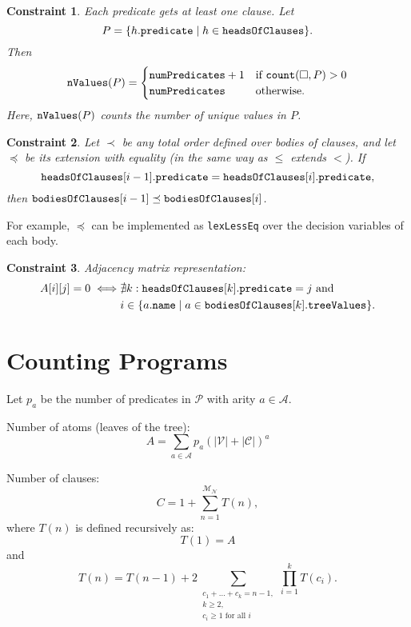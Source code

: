 \documentclass[runningheads]{llncs}
\newtheorem{constraint}{Constraint}
\newcommand{\variable}[1]{\texttt{\textup{#1}}}
\newcommand{\predicates}{\mathcal{P}}
\newcommand{\variables}{\mathcal{V}}
\newcommand{\constants}{\mathcal{C}}
\newcommand{\arities}{\mathcal{A}}
\newcommand{\maxNumNodes}{\mathcal{M}_{\mathcal{N}}}
\begin{document}
\begin{constraint}
  Each predicate gets at least one clause. Let
  \[
    P = \{ h.\variable{predicate} \mid h \in \variable{headsOfClauses} \}.
  \]
  Then
  \[
    \variable{nValues}(P) =
    \begin{cases}
      \variable{numPredicates} + 1 & \text{if } \variable{count}(\Box, P) > 0 \\
      \variable{numPredicates} & \text{otherwise.}
    \end{cases}
  \]
  Here, $\variable{nValues}(P)$ counts the number of unique values in $P$.
\end{constraint}

\begin{constraint}
  Let $\prec$ be any total order defined over bodies of clauses, and let
  $\preceq$ be its extension with equality (in the same way as $\le$ extends
  $<$). If
  \[
    \variable{headsOfClauses}[i-1].\variable{predicate} =
    \variable{headsOfClauses}[i].\variable{predicate},
  \]
  then $\variable{bodiesOfClauses}[i-1] \preceq \variable{bodiesOfClauses}[i]$.
\end{constraint}
For example, $\preceq$ can be implemented as \variable{lexLessEq} over the
decision variables of each body. %

\begin{constraint}
  Adjacency matrix representation:
  \begin{align*}
    A[i][j] = 0 \iff &\nexists k: \variable{headsOfClauses}[k].\variable{predicate} = j \text{ and } \\
    &i \in \{ a.\variable{name} \mid a \in \variable{bodiesOfClauses}[k].\variable{treeValues} \}.
  \end{align*}
\end{constraint}

\section{Counting Programs}

Let $p_a$ be the number of predicates in $\predicates{}$ with arity $a \in
\arities{}$.

Number of atoms (leaves of the tree):
\[
  A = \sum_{a \in \arities{}} p_a(|\variables{}| + |\constants{}|)^a
\]

Number of clauses:
\[
  C = 1 + \sum_{n=1}^{\maxNumNodes{}} T(n),
\]
where $T(n)$ is defined recursively as:
\[
  T(1) = A
\]
and
\[
  T(n) = T(n-1) + 2\sum_{\substack{c_1 + \dots + c_k = n - 1,\\
      k \ge 2,\\
      c_i \ge 1 \text{ for all } i}} \prod_{i=1}^k T(c_i).
\]
\end{document}
